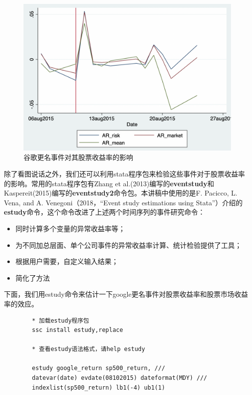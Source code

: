 \documentclass[cn,12pt,math=newtx,citestyle=gb7714-2015,bibstyle=gb7714-2015]{elegantbook}
\begin{document}
	\begin{figure}[tbph]
		\centering
		\includegraphics[width=1\linewidth]{google_AR}
		\caption{谷歌更名事件对其股票收益率的影响}
		\label{fig:google_AR}
	\end{figure}
	
	除了看图说话之外，我们还可以利用stata程序包来检验这些事件对于股票收益率的影响。常用的stata程序包有Zhang et al.(2013)编写的\textbf{eventstudy}和Kaspereit(2015)编写的\textbf{eventstudy2}命令包。本讲稿中使用的是F. Pacicco, L. Vena, and A. Venegoni（2018，“Event study estimations using Stata”）介绍的\textbf{estudy}命令，这个命令改进了上述两个时间序列的事件研究命令：
	
	\begin{itemize}
		\item 同时计算多个变量的异常收益率等；
		\item 为不同加总层面、单个公司事件的异常收益率计算、统计检验提供了工具；
		\item 根据用户需要，自定义输入结果；
		\item 简化了方法
	\end{itemize}
	
	下面，我们用estudy命令来估计一下google更名事件对股票收益率和股票市场收益率的效应。
	
	\begin{lstlisting}
		* 加载estudy程序包
		ssc install estudy,replace
		
		* 查看estudy语法格式，请help estudy
		
		estudy google_return sp500_return, ///
		datevar(date) evdate(08102015) dateformat(MDY) ///
		indexlist(sp500_return) lb1(-4) ub1(1)
		
	\end{lstlisting}
	
\end{document}
